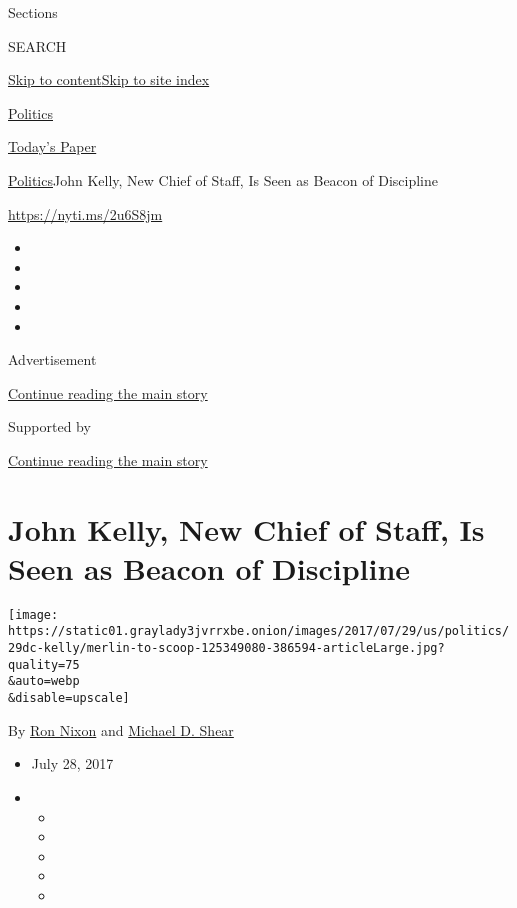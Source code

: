 Sections

SEARCH

\protect\hyperlink{site-content}{Skip to
content}\protect\hyperlink{site-index}{Skip to site index}

\href{https://www.nytimes3xbfgragh.onion/section/politics}{Politics}

\href{https://myaccount.nytimes3xbfgragh.onion/auth/login?response_type=cookie\&client_id=vi}{}

\href{https://www.nytimes3xbfgragh.onion/section/todayspaper}{Today's
Paper}

\href{/section/politics}{Politics}\textbar{}John Kelly, New Chief of
Staff, Is Seen as Beacon of Discipline

\url{https://nyti.ms/2u6S8jm}

\begin{itemize}
\item
\item
\item
\item
\item
\end{itemize}

Advertisement

\protect\hyperlink{after-top}{Continue reading the main story}

Supported by

\protect\hyperlink{after-sponsor}{Continue reading the main story}

\hypertarget{john-kelly-new-chief-of-staff-is-seen-as-beacon-of-discipline}{%
\section{John Kelly, New Chief of Staff, Is Seen as Beacon of
Discipline}\label{john-kelly-new-chief-of-staff-is-seen-as-beacon-of-discipline}}

\texttt{[image: https://static01.graylady3jvrrxbe.onion/images/2017/07/29/us/politics/29dc-kelly/merlin-to-scoop-125349080-386594-articleLarge.jpg?quality=75\\\&auto=webp\\\&disable=upscale]}

By \href{http://www.nytimes3xbfgragh.onion/by/ron-nixon}{Ron Nixon} and
\href{http://www.nytimes3xbfgragh.onion/by/michael-d-shear}{Michael D.
Shear}

\begin{itemize}
\item
  July 28, 2017
\item
  \begin{itemize}
  \item
  \item
  \item
  \item
  \item
  \end{itemize}
\end{itemize}


